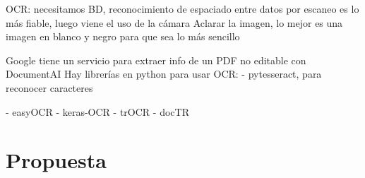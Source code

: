 OCR:
necesitamos BD, reconocimiento de espaciado entre datos
por escaneo es lo más fiable, luego viene el uso de la cámara
Aclarar la imagen, lo mejor es una imagen en blanco y negro para que sea lo más sencillo

Google tiene un servicio para extraer info de un PDF no editable con DocumentAI
Hay librerías en python para usar OCR:
    - pytesseract, para reconocer caracteres 

- easyOCR
- keras-OCR
- trOCR
- docTR

\section{Propuesta}

